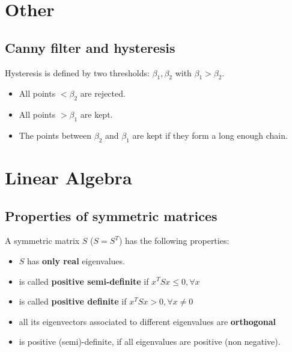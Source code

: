 \section{Other}


\subsection{Canny filter and hysteresis}

Hysteresis is defined by two thresholds: $\beta_1, \beta_2$ with $\beta_1 > \beta_2$.
\begin{itemize}
    \item All points $< \beta_2$ are rejected.
    \item All points $> \beta_1$ are kept.
    \item The points between $\beta_2$ and $\beta_1$ are kept if they form a long enough chain.
\end{itemize}

\section{Linear Algebra}
\subsection{Properties of symmetric matrices}
A symmetric matrix $S$ ($S = S^T$) has the following properties:
\begin{itemize}
    \item $S$ has \textbf{only real} eigenvalues.
    \item is called \textbf{positive semi-definite} if $x^TSx \leq 0, \forall x$
    \item is called \textbf{positive definite} if $x^TSx > 0, \forall x \neq 0$
    \item all its eigenvectors associated to different eigenvalues are \textbf{orthogonal}
    \item is positive (semi)-definite, if all eigenvalues are positive (non negative).
\end{itemize}




